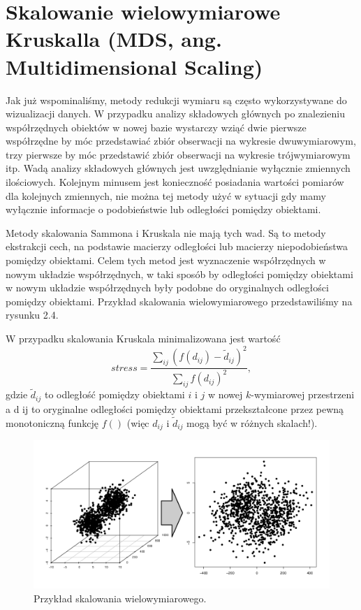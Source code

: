 \documentclass[polish,]{book}
\begin{document}
\hypertarget{part_23}{%
\section{Skalowanie wielowymiarowe Kruskalla (MDS, ang. Multidimensional Scaling)}\label{part_23}}

Jak już wspominaliśmy, metody redukcji wymiaru są często wykorzystywane do wizualizacji danych. W przypadku analizy składowych głównych po znalezieniu współrzędnych obiektów w nowej bazie wystarczy wziąć dwie pierwsze współrzędne by móc przedstawiać zbiór obserwacji na wykresie dwuwymiarowym, trzy pierwsze by móc
przedstawić zbiór obserwacji na wykresie trójwymiarowym itp. Wadą analizy składowych głównych jest uwzględnianie wyłącznie zmiennych ilościowych. Kolejnym
minusem jest konieczność posiadania wartości pomiarów dla kolejnych zmiennych,
nie można tej metody użyć w sytuacji gdy mamy wyłącznie informacje o podobieństwie lub odległości pomiędzy obiektami.

Metody skalowania Sammona i Kruskala nie mają tych wad. Są to metody ekstrakcji cech, na podstawie macierzy odległości lub macierzy niepodobieństwa pomiędzy obiektami. Celem tych metod jest wyznaczenie współrzędnych w nowym
układzie współrzędnych, w taki sposób by odległości pomiędzy obiektami w nowym
układzie współrzędnych były podobne do oryginalnych odległości pomiędzy obiektami. Przykład skalowania wielowymiarowego przedstawiliśmy na rysunku 2.4.

W przypadku skalowania Kruskala minimalizowana jest wartość
\[
stress=\frac{\sum_{ij}(f(d_{ij})-\tilde{d}_{ij})^2}{\sum_{ij}f(d_{ij})^2},
\]
gdzie \(\tilde{d}_{ij}\) to odległość pomiędzy obiektami \(i\) i \(j\) w nowej \(k\)-wymiarowej przestrzeni a d ij to oryginalne odległości pomiędzy obiektami przekształcone przez pewną monotoniczną funkcję \(f()\) (więc \(d_{ij}\) i \(\tilde{d}_{ij}\) mogą być w różnych skalach!).

\begin{figure}

{\centering \includegraphics[width=1\linewidth]{isoMDSprzykald} 

}

\caption{Przykład skalowania wielowymiarowego.}\label{fig:MDS}
\end{figure}
\end{document}
